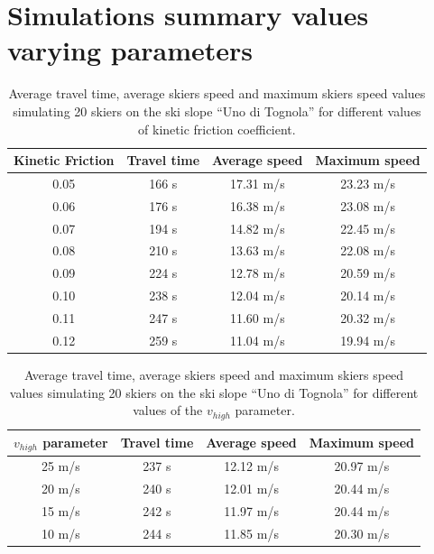 \documentclass[12pt,a4paper,twoside]{book}
\begin{document}
\chapter{Simulations summary values varying parameters}
\begin{table}[h]
  \centering
  \begin{tabular}{ | c | c | c | c | }
    \hline
    Kinetic Friction & Travel time & Average speed & Maximum speed \\
    \hline
    0.05 & 166 s & 17.31 m/s & 23.23 m/s \\
    \hline
    0.06 & 176 s & 16.38 m/s & 23.08 m/s \\
    \hline
    0.07 & 194 s & 14.82 m/s & 22.45 m/s \\
    \hline
    0.08 & 210 s & 13.63 m/s & 22.08 m/s \\
    \hline
    0.09 & 224 s & 12.78 m/s & 20.59 m/s \\
    \hline
    0.10 & 238 s & 12.04 m/s & 20.14 m/s \\
    \hline
    0.11 & 247 s & 11.60 m/s & 20.32 m/s \\
    \hline
    0.12 & 259 s & 11.04 m/s & 19.94 m/s \\
    \hline
  \end{tabular}
  \caption{Average travel time, average skiers speed and maximum skiers speed values simulating 20 skiers on the ski slope ``Uno di Tognola'' for different values of kinetic friction coefficient.}
\end{table}
\begin{table}
  \centering
  \begin{tabular}{ | c | c | c | c | }
    \hline
    ${v_{high}}$ parameter & Travel time & Average speed & Maximum speed \\
    \hline
    25 m/s & 237 s & 12.12 m/s & 20.97 m/s \\
    \hline
    20 m/s & 240 s & 12.01 m/s & 20.44 m/s \\
    \hline
    15 m/s & 242 s & 11.97 m/s & 20.44 m/s \\
    \hline
    10 m/s & 244 s & 11.85 m/s & 20.30 m/s \\
    \hline
  \end{tabular}
  \caption{Average travel time, average skiers speed and maximum skiers speed values simulating 20 skiers on the ski slope ``Uno di Tognola'' for different values of the ${v_{high}}$ parameter.}
\end{table}
\newpage
\thispagestyle{plain}
\end{document}
